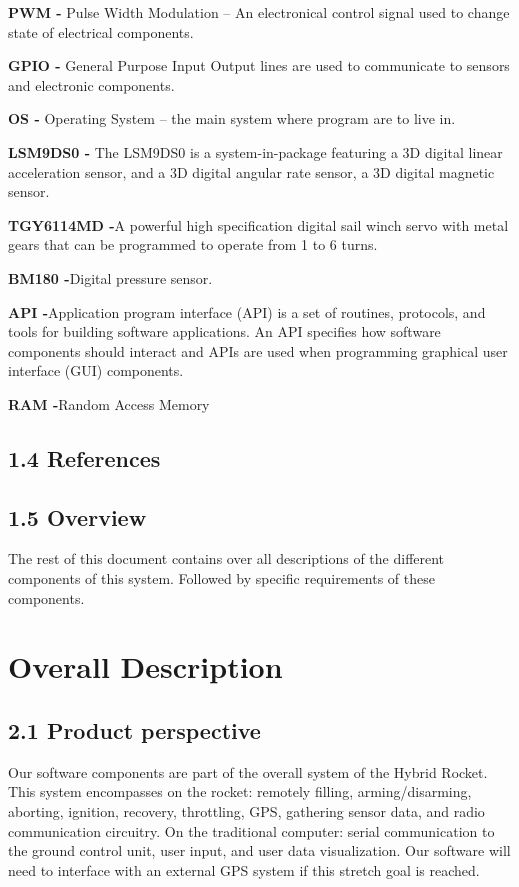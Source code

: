 \documentclass[10pt,draftclsnofoot,onecolumn]{IEEEtran}
\begin{document}
{\bf PWM -} Pulse Width Modulation – An electronical control signal used to change state of electrical components.\par
{\bf GPIO -}  General Purpose Input Output lines are used to communicate to sensors and electronic components.\par
{\bf OS -} Operating System – the main system where program are to live in.\par
{\bf LSM9DS0 -} The LSM9DS0 is a system-in-package featuring a 3D digital linear acceleration sensor, and a 3D digital angular rate sensor, a 3D digital magnetic sensor.\par
{\bf TGY6114MD -}A powerful high specification digital sail winch servo with metal gears that can be programmed to operate from 1 to 6 turns.\par
{\bf BM180 -}Digital pressure sensor.\par
{\bf API -}Application program interface (API) is a set of routines, protocols, and tools for building software applications. An API specifies how software components should interact and APIs are used when programming graphical user interface (GUI) components.\par
{\bf RAM -}Random Access Memory\par

\subsection{1.4  References}
\subsection{1.5 Overview}
The rest of this document contains over all descriptions of the different components of this system. Followed by specific requirements of these components.

\section{ Overall Description}
\subsection{2.1 Product perspective}
Our software components are part of the overall system of the Hybrid Rocket. This system encompasses on the rocket: remotely filling, arming/disarming, aborting, ignition, recovery, throttling, GPS, gathering sensor data, and radio communication circuitry.  On the traditional computer: serial communication to the ground control unit, user input, and user data visualization. Our software will need to interface with an external GPS system if this stretch goal is reached. 
\end{document}
